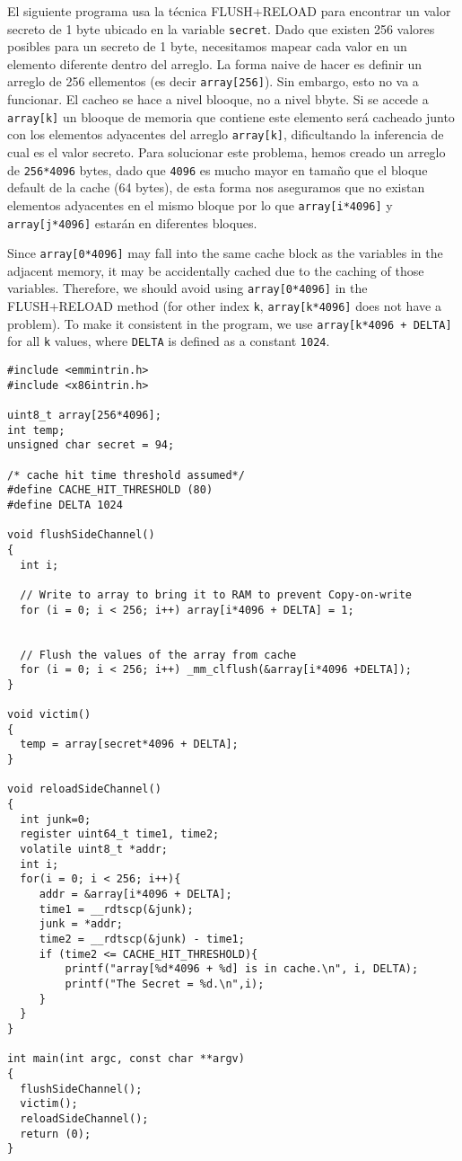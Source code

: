 El siguiente programa usa la técnica FLUSH+RELOAD para encontrar un valor secreto de 1 byte ubicado en la variable \texttt{secret}. Dado que existen 256 valores posibles para un secreto de 1 byte, necesitamos mapear cada valor en un elemento diferente dentro del arreglo. La forma naive de hacer es definir un arreglo de 256 ellementos (es decir \texttt{array[256]}). Sin embargo, esto no va a funcionar. El cacheo se hace a nivel blooque, no a nivel bbyte. Si se accede a \texttt{array[k]} un blooque de memoria que contiene este elemento será cacheado junto con los elementos adyacentes del arreglo \texttt{array[k]}, dificultando la inferencia de cual es el valor secreto.
Para solucionar este problema, hemos creado un arreglo de \texttt{256*4096} bytes, dado que \texttt{4096} es mucho mayor en tamaño que el bloque default de la cache (64 bytes), de esta forma nos aseguramos que no existan elementos adyacentes en el mismo bloque por lo que \texttt{array[i*4096]} y \texttt{array[j*4096]} estarán en diferentes bloques.

Since \texttt{array[0*4096]} may fall into the same cache block as the variables 
in the adjacent memory, it may be accidentally cached due to the caching 
of those variables. Therefore, we should avoid using \texttt{array[0*4096]} in
the FLUSH+RELOAD method (for other index \texttt{k}, \texttt{array[k*4096]} does not
have a problem).
To make it consistent in the program, we use 
\texttt{array[k*4096 + DELTA]} for all \texttt{k} values, 
where \texttt{DELTA} is defined as a constant \texttt{1024}. 


\begin{lstlisting}[caption=\texttt{FlushReload.c}, label={sidechannel:list:flushreload}]
#include <emmintrin.h>
#include <x86intrin.h>

uint8_t array[256*4096];
int temp;
unsigned char secret = 94;

/* cache hit time threshold assumed*/
#define CACHE_HIT_THRESHOLD (80)
#define DELTA 1024

void flushSideChannel()
{
  int i;

  // Write to array to bring it to RAM to prevent Copy-on-write
  for (i = 0; i < 256; i++) array[i*4096 + DELTA] = 1;


  // Flush the values of the array from cache
  for (i = 0; i < 256; i++) _mm_clflush(&array[i*4096 +DELTA]);
}

void victim()
{
  temp = array[secret*4096 + DELTA];
}

void reloadSideChannel() 
{
  int junk=0;
  register uint64_t time1, time2;
  volatile uint8_t *addr;
  int i;
  for(i = 0; i < 256; i++){
     addr = &array[i*4096 + DELTA];
     time1 = __rdtscp(&junk);
     junk = *addr;
     time2 = __rdtscp(&junk) - time1;
     if (time2 <= CACHE_HIT_THRESHOLD){
         printf("array[%d*4096 + %d] is in cache.\n", i, DELTA);
         printf("The Secret = %d.\n",i);
     }
  }	
}

int main(int argc, const char **argv) 
{
  flushSideChannel();
  victim();
  reloadSideChannel();
  return (0);
}
\end{lstlisting}
 

